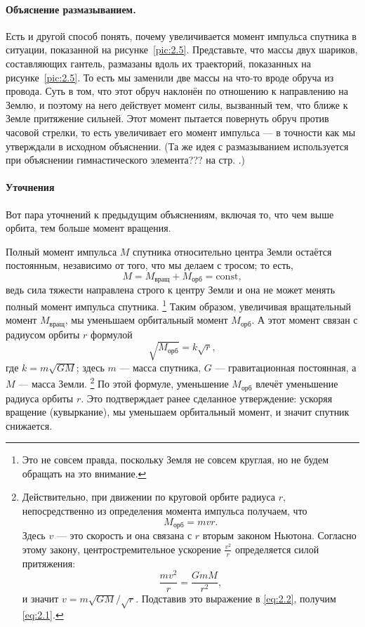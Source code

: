 \paragraph{Объяснение размазыванием.}
Есть и другой способ понять, почему увеличивается момент импульса спутника в ситуации, показанной на рисунке~\ref{pic:2.5}.
Представьте, что массы двух шариков, составляющих гантель, размазаны вдоль их траекторий,
показанных на рисунке~\ref{pic:2.5}.
То есть мы заменили две массы на что-то вроде обруча из провода.
Суть в том, что этот обруч наклонён по отношению к направлению на Землю, и поэтому на него действует момент  силы, вызванный тем, что ближе к Земле притяжение сильней.
Этот момент пытается повернуть обруч против часовой стрелки,
то есть увеличивает его момент импульса — в точности как мы утверждали в исходном объяснении.
(Та же идея с размазыванием используется при объяснении гимнастического элемента??? на стр. \pageref{???}.)

\paragraph*{Уточнения}
Вот пара уточнений к предыдущим объяснениям, включая то, что чем выше орбита, тем больше момент вращения.

Полный момент импульса $M$ спутника относительно центра Земли остаётся постоянным, независимо от того, что мы делаем с тросом; то есть,
\[
M = M_{\text{вращ}} + M_{\text{орб}} = \mathrm{const},
\]
ведь сила тяжести направлена строго к центру Земли и она не может менять полный момент импульса спутника.%
\footnote{Это не совсем правда, поскольку Земля не совсем круглая, но не будем обращать на это внимание.}
Таким образом, увеличивая вращательный момент $M_{\text{вращ}}$, мы уменьшаем орбитальный момент $M_{\text{орб}}$.
А этот момент связан с радиусом орбиты $r$ формулой
\begin{equation}
\sqrt{M_{\text{орб}}} = k \sqrt{r}, \label{eq:2.1}
\end{equation}
где $k = m \sqrt{G M}$; здесь $m$ --- масса спутника, $G$ --- гравитационная постоянная, а $M$ --- масса Земли.%
\footnote{Действительно, при движении по круговой орбите радиуса $r$, непосредственно из определения момента импульса получаем, что
\begin{equation}
M_{\text{орб}} = m v r. \label{eq:2.2}
\end{equation}
Здесь $v$ — это скорость и она связана с $r$ вторым законом Ньютона.
Согласно этому закону, центростремительное ускорение $\frac{v^2}{r}$ определяется силой притяжения:
\[
\frac{m  v^2}{r} = \frac{G m M}{r^2},
\]
и значит
$v = m  \sqrt{G M}/\sqrt{r}$.
Подставив это выражение в \eqref{eq:2.2}, получим \eqref{eq:2.1}.}
По этой формуле, уменьшение $M_{\text{орб}}$ влечёт уменьшение радиуса орбиты $r$.
Это подтверждает ранее сделанное утверждение: ускоряя вращение (кувыркание), мы уменьшаем орбитальный момент, и значит спутник снижается.

